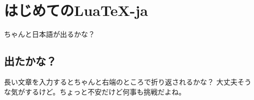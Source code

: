 \documentclass{ltjsarticle}
\begin{document}
\section{はじめてのLua\TeX-ja}
ちゃんと日本語が出るかな？
\subsection{出たかな？}
長い文章を入力するとちゃんと右端のところで折り返されるかな？
大丈夫そうな気がするけど。ちょっと不安だけど何事も挑戦だよね。
\end{document}
